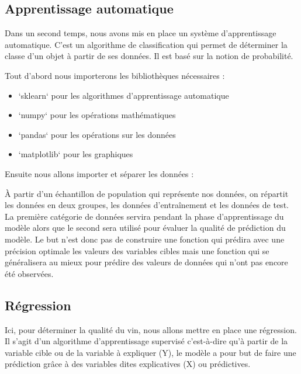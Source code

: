 
\subsection{Apprentissage automatique}

Dans un second temps, nous avons mis en place un système d'apprentissage automatique. C'est un algorithme de
classification qui permet de déterminer la classe d'un objet à partir de ses données. Il est basé
sur la notion de probabilité.

\vspace{0.5cm}

Tout d'abord nous importerons les bibliothèques nécessaires :

\begin{itemize}
    \item `sklearn` pour les algorithmes d'apprentissage automatique
    \item `numpy` pour les opérations mathématiques
    \item `pandas` pour les opérations sur les données
    \item `matplotlib` pour les graphiques
\end{itemize}

\vspace{0.5cm}

Ensuite nous allons importer et séparer les données :

À partir d’un échantillon de population qui représente nos données, on répartit les
données en deux groupes, les données d’entraînement et les données de test. La première
catégorie de données servira pendant la phase d’apprentissage du modèle alors que le
second sera utilisé pour évaluer la qualité de prédiction du modèle. Le but n’est donc
pas de construire une fonction qui prédira avec une précision optimale les valeurs des
variables cibles mais une fonction qui se généralisera au mieux pour prédire des valeurs
de données qui n’ont pas encore été observées.

\vspace{1.5cm}

\subsection{Régression}

Ici, pour déterminer la qualité du vin, nous allons mettre en place une régression.
Il s'agit d'un algorithme d’apprentissage supervisé c’est-à-dire qu’à partir de la
variable cible ou de la variable à expliquer (Y), le modèle a pour but de faire une
prédiction grâce à des variables dites explicatives (X) ou prédictives.

